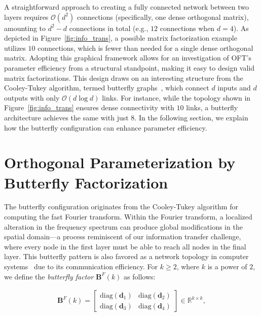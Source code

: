 A straightforward approach to creating a fully connected network between two layers requires $\mathcal{O}(d^2)$ connections (specifically, one dense orthogonal matrix), amounting to $d^2-d$ connections in total (e.g., $12$ connections when $d=4$). As depicted in Figure~\ref{fig:info_trans}, a possible matrix factorization example utilizes $10$ connections, which is fewer than needed for a single dense orthogonal matrix. Adopting this graphical framework allows for an investigation of OFT's parameter efficiency from a structural standpoint, making it easy to design valid matrix factorizations. This design draws on an interesting structure from the Cooley-Tukey algorithm, termed butterfly graphs~\cite{cooley1965algorithm}, which connect $d$ inputs and $d$ outputs with only $\mathcal{O}(d\log d)$ links. For instance, while the topology shown in Figure~\ref{fig:info_trans} ensures dense connectivity with $10$ links, a butterfly architecture achieves the same with just $8$. In the following section, we explain how the butterfly configuration can enhance parameter efficiency.

\section{Orthogonal Parameterization by Butterfly Factorization}

The butterfly configuration originates from the Cooley-Tukey algorithm for computing the fast Fourier transform. Within the Fourier transform, a localized alteration in the frequency spectrum can produce global modifications in the spatial domain—a process reminiscent of our information transfer challenge, where every node in the first layer must be able to reach all nodes in the final layer. This butterfly pattern is also favored as a network topology in computer systems~\cite{solihin2015fundamentals,li2011linear} due to its communication efficiency. For $k \geq 2$, where $k$ is a power of $2$, we define the \emph{butterfly factor} $\bm{B}^F(k)$ as follows:

\begin{equation}\label{eq:but_factor}
\begin{aligned}
    \bm{B}^F(k)=\begin{bmatrix}
    \text{diag}(\bm{d}_1) & \text{diag}(\bm{d}_2) \\
    \text{diag}(\bm{d}_3) & \text{diag}(\bm{d}_4)
    \end{bmatrix}\in\mathbb{R}^{k\times k},
\end{aligned}
\end{equation}


